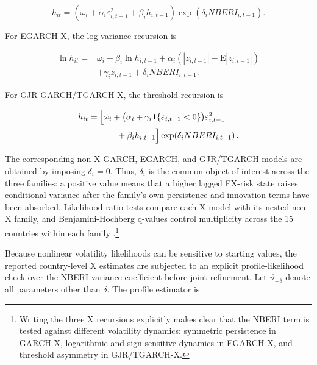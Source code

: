 \documentclass[11pt]{article}
\begin{document}
\begin{equation}
\label{eq:garchx-country}
h_{it}
=\left(\omega_i+\alpha_i\varepsilon_{i,t-1}^{2}+\beta_i h_{i,t-1}\right)
\exp\!\left(\delta_i NBERI_{i,t-1}\right).
\end{equation}

For EGARCH-X, the log-variance recursion is

\begin{equation}
\label{eq:egarchx-country}
\begin{aligned}
\ln h_{it}
={}&\omega_i+\beta_i\ln h_{i,t-1}
+\alpha_i\!\left(|z_{i,t-1}|-\mathrm{E}|z_{i,t-1}|\right)\\
&+\gamma_i z_{i,t-1}+\delta_i NBERI_{i,t-1}.
\end{aligned}
\end{equation}

For GJR-GARCH/TGARCH-X, the threshold recursion is

\begin{equation}
\label{eq:gjrx-country}
\begin{aligned}
h_{it}
={}&\Bigl[\omega_i+
\bigl(\alpha_i+\gamma_i\mathbf{1}\{\varepsilon_{i,t-1}<0\}\bigr)
\varepsilon_{i,t-1}^{2}\\
&\qquad+\beta_i h_{i,t-1}\Bigr]
\exp\!\left(\delta_i NBERI_{i,t-1}\right).
\end{aligned}
\end{equation}

The corresponding non-X GARCH, EGARCH, and GJR/TGARCH models are obtained by imposing $\delta_i=0$. Thus, $\delta_i$ is the common object of interest across the three families: a positive value means that a higher lagged FX-risk state raises conditional variance after the family's own persistence and innovation terms have been absorbed. Likelihood-ratio tests compare each X model with its nested non-X family, and Benjamini-Hochberg q-values control multiplicity across the 15 countries within each family \citep{benjamini1995}.\footnote{Writing the three X recursions explicitly makes clear that the NBERI term is tested against different volatility dynamics: symmetric persistence in GARCH-X, logarithmic and sign-sensitive dynamics in EGARCH-X, and threshold asymmetry in GJR/TGARCH-X.}

Because nonlinear volatility likelihoods can be sensitive to starting values, the reported country-level X estimates are subjected to an explicit profile-likelihood check over the NBERI variance coefficient before joint refinement. Let $\vartheta_{-\delta}$ denote all parameters other than $\delta$. The profile estimator is
\end{document}
